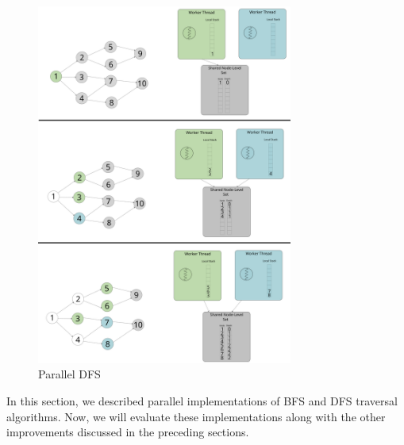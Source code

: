 \begin{figure}[ht]
    \centering
    \includegraphics[width=0.75\textwidth]{figures/parallelDFS.png}
    \caption{Parallel DFS}
    \label{fig:parallelDFS}
\end{figure}

\smallskip
In this section, we described parallel implementations of BFS and DFS traversal
algorithms. Now, we will evaluate these implementations along with the other
improvements discussed in the preceding sections.
